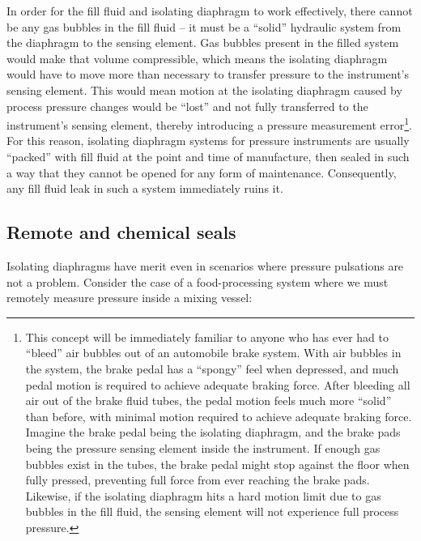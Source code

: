 In order for the fill fluid and isolating diaphragm to work effectively, there cannot be any gas bubbles in the fill fluid -- it must be a ``solid'' hydraulic system from the diaphragm to the sensing element.  Gas bubbles present in the filled system would make that volume compressible, which means the isolating diaphragm would have to move more than necessary to transfer pressure to the instrument's sensing element.  This would mean motion at the isolating diaphragm caused by process pressure changes would be ``lost'' and not fully transferred to the instrument's sensing element, thereby introducing a pressure measurement error\footnote{This concept will be immediately familiar to anyone who has ever had to ``bleed'' air bubbles out of an automobile brake system.  With air bubbles in the system, the brake pedal has a ``spongy'' feel when depressed, and much pedal motion is required to achieve adequate braking force.  After bleeding all air out of the brake fluid tubes, the pedal motion feels much more ``solid'' than before, with minimal motion required to achieve adequate braking force.  Imagine the brake pedal being the isolating diaphragm, and the brake pads being the pressure sensing element inside the instrument.  If enough gas bubbles exist in the tubes, the brake pedal might stop against the floor when fully pressed, preventing full force from ever reaching the brake pads.  Likewise, if the isolating diaphragm hits a hard motion limit due to gas bubbles in the fill fluid, the sensing element will not experience full process pressure.}.  For this reason, isolating diaphragm systems for pressure instruments are usually ``packed'' with fill fluid at the point and time of manufacture, then sealed in such a way that they cannot be opened for any form of maintenance.  Consequently, any fill fluid leak in such a system immediately ruins it.





\filbreak
\subsection{Remote and chemical seals}

Isolating diaphragms have merit even in scenarios where pressure pulsations are not a problem.  Consider the case of a food-processing system where we must remotely measure pressure inside a mixing vessel:  

